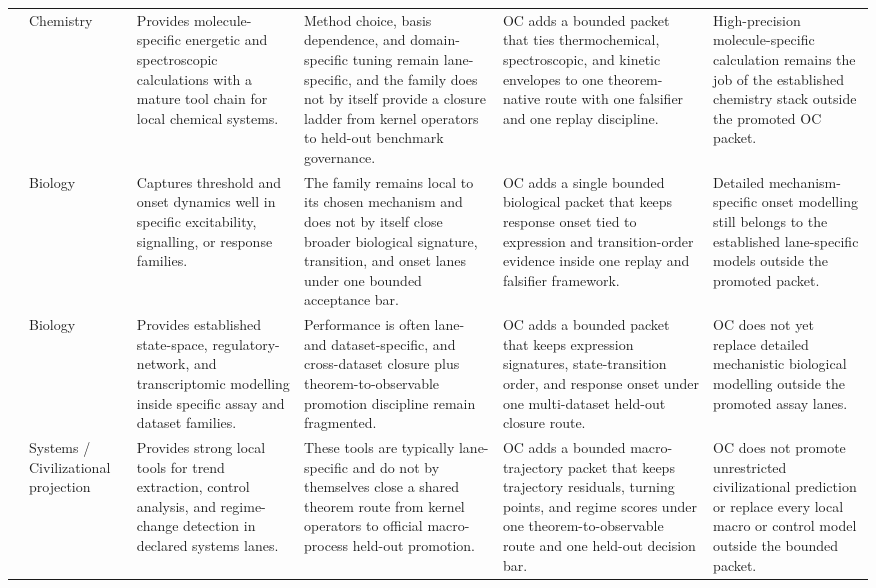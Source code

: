 \begin{longtable}{@{}L{0.17\textwidth}L{0.09\textwidth}L{0.17\textwidth}L{0.17\textwidth}L{0.20\textwidth}L{0.14\textwidth}@{}}
 & Chemistry & Provides molecule-specific energetic and spectroscopic calculations with a mature tool chain for local chemical systems. & Method choice, basis dependence, and domain-specific tuning remain lane-specific, and the family does not by itself provide a closure ladder from kernel operators to held-out benchmark governance. & OC adds a bounded packet that ties thermochemical, spectroscopic, and kinetic envelopes to one theorem-native route with one falsifier and one replay discipline. & High-precision molecule-specific calculation remains the job of the established chemistry stack outside the promoted OC packet. \\
 & Biology & Captures threshold and onset dynamics well in specific excitability, signalling, or response families. & The family remains local to its chosen mechanism and does not by itself close broader biological signature, transition, and onset lanes under one bounded acceptance bar. & OC adds a single bounded biological packet that keeps response onset tied to expression and transition-order evidence inside one replay and falsifier framework. & Detailed mechanism-specific onset modelling still belongs to the established lane-specific models outside the promoted packet. \\
 & Biology & Provides established state-space, regulatory-network, and transcriptomic modelling inside specific assay and dataset families. & Performance is often lane- and dataset-specific, and cross-dataset closure plus theorem-to-observable promotion discipline remain fragmented. & OC adds a bounded packet that keeps expression signatures, state-transition order, and response onset under one multi-dataset held-out closure route. & OC does not yet replace detailed mechanistic biological modelling outside the promoted assay lanes. \\
 & Systems / Civilizational projection & Provides strong local tools for trend extraction, control analysis, and regime-change detection in declared systems lanes. & These tools are typically lane-specific and do not by themselves close a shared theorem route from kernel operators to official macro-process held-out promotion. & OC adds a bounded macro-trajectory packet that keeps trajectory residuals, turning points, and regime scores under one theorem-to-observable route and one held-out decision bar. & OC does not promote unrestricted civilizational prediction or replace every local macro or control model outside the bounded packet. \\

\end{longtable}
